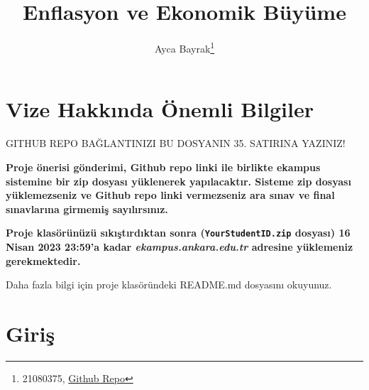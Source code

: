 \documentclass[
  12pt,
]{article}
\title{Enflasyon ve Ekonomik Büyüme}
\author{Ayca Bayrak\footnote{21080375, \href{https://github.com/aycabayrak/arasinav.git}{Github Repo}}}
\date{}
\begin{document}
\maketitle

\hypertarget{vize-hakkux131nda-uxf6nemli-bilgiler}{%
\section{Vize Hakkında Önemli Bilgiler}\label{vize-hakkux131nda-uxf6nemli-bilgiler}}

\colorbox{BurntOrange}{GITHUB REPO BAĞLANTINIZI BU DOSYANIN 35. SATIRINA YAZINIZ!}

\textbf{Proje önerisi gönderimi, Github repo linki ile birlikte ekampus sistemine bir zip dosyası yüklenerek yapılacaktır. Sisteme zip dosyası yüklemezseniz ve Github repo linki vermezseniz ara sınav ve final sınavlarına girmemiş sayılırsınız.}

\textbf{Proje klasörünüzü sıkıştırdıktan sonra (\texttt{YourStudentID.zip} dosyası) 16 Nisan 2023 23:59'a kadar \emph{ekampus.ankara.edu.tr} adresine yüklemeniz gerekmektedir.}

\colorbox{WildStrawberry}{Daha fazla bilgi için proje klasöründeki README.md dosyasını okuyunuz.}

\hypertarget{giriux15f}{%
\section{Giriş}\label{giriux15f}}
\end{document}
